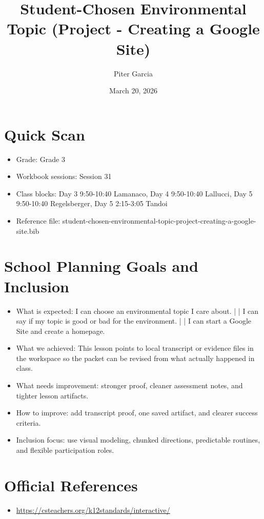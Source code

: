 \documentclass[11pt]{article}
\title{Student-Chosen Environmental Topic (Project - Creating a Google Site)}
\author{Piter Garcia}
\date{March 20, 2026}
\begin{document}
\maketitle
\section*{Quick Scan}
\begin{itemize}[leftmargin=*]
\item Grade: Grade 3
\item Workbook sessions: Session 31
\item Class blocks: Day 3 9:50-10:40 Lamanaco, Day 4 9:50-10:40 Lallucci, Day 5 9:50-10:40 Regelsberger, Day 5 2:15-3:05 Tandoi
\item Reference file: student-chosen-environmental-topic-project-creating-a-google-site.bib
\end{itemize}
\section*{School Planning Goals and Inclusion}
\begin{itemize}[leftmargin=*]
\item What is expected: I can choose an environmental topic I care about. | | I can say if my topic is good or bad for the environment. | | I can start a Google Site and create a homepage.
\item What we achieved: This lesson points to local transcript or evidence files in the workspace so the packet can be revised from what actually happened in class.
\item What needs improvement: stronger proof, cleaner assessment notes, and tighter lesson artifacts.
\item How to improve: add transcript proof, one saved artifact, and clearer success criteria.
\item Inclusion focus: use visual modeling, chunked directions, predictable routines, and flexible participation roles.
\end{itemize}
\section*{Official References}
\begin{itemize}[leftmargin=*]
\item \url{https://csteachers.org/k12standards/interactive/}

\end{itemize}
\end{document}
